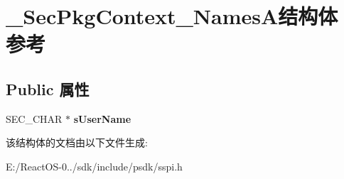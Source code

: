 \hypertarget{struct___sec_pkg_context___names_a}{}\section{\+\_\+\+Sec\+Pkg\+Context\+\_\+\+Names\+A结构体 参考}
\label{struct___sec_pkg_context___names_a}
\subsection*{Public 属性}
\begin{DoxyCompactItemize}
\item 
\mbox{\label{struct___sec_pkg_context___names_a_a5967bdba82667ea6e85fb4594a06cd91}} 
S\+E\+C\+\_\+\+C\+H\+AR $\ast$ {\bfseries s\+User\+Name}
\end{DoxyCompactItemize}


该结构体的文档由以下文件生成\+:\begin{DoxyCompactItemize}
\item 
E\+:/\+React\+O\+S-\/0../sdk/include/psdk/sspi.\+h\end{DoxyCompactItemize}
